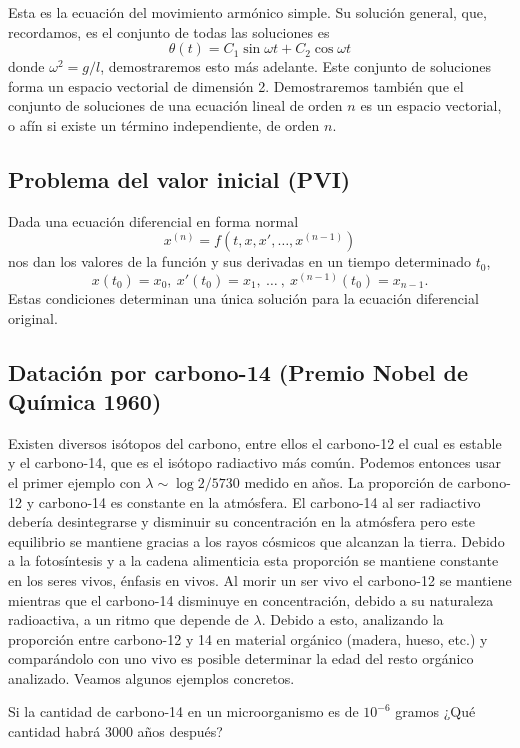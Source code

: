 \documentclass[../ecuaciones_diferenciales.tex]{subfiles}
\begin{document}
Esta es la ecuación del movimiento armónico simple. Su solución general, que,
recordamos, es el conjunto de todas las soluciones es
\[\theta(t) = C_1 \sin \omega t + C_2 \cos \omega t\]
donde \(\omega^2 = g/l\), demostraremos esto más adelante. Este conjunto de
soluciones forma un espacio vectorial de dimensión 2. Demostraremos también que
el conjunto de soluciones de una ecuación lineal de orden \(n\) es un espacio
vectorial, o afín si existe un término independiente, de orden \(n\).

\subsection{Problema del valor inicial (PVI)}

Dada una ecuación diferencial en forma normal
\[x^{(n)} = f(t, x, x', \dots, x^{(n - 1)})\]
nos dan los valores de la función y sus derivadas en un tiempo determinado
\(t_0\),
\[x(t_0) = x_0,\ x'(t_0) = x_1,\ \dots\ ,\ x^{(n - 1)}(t_0) = x_{n - 1}.\]
Estas condiciones determinan una única solución para la ecuación diferencial
original.

\subsection{Datación por carbono-14 (Premio Nobel de Química 1960)}

Existen diversos isótopos del carbono, entre ellos el carbono-12 el cual es
estable y el carbono-14, que es el isótopo radiactivo más común. Podemos
entonces usar el primer ejemplo con \(\lambda \sim \log 2 / 5730\) medido en
años. La proporción de carbono-12 y carbono-14 es constante en la atmósfera. El
carbono-14 al ser radiactivo debería desintegrarse y disminuir su concentración
en la atmósfera pero este equilibrio se mantiene gracias a los rayos cósmicos
que alcanzan la tierra. Debido a la fotosíntesis y a la cadena alimenticia esta
proporción se mantiene constante en los seres vivos, énfasis en vivos. Al morir
un ser vivo el carbono-12 se mantiene mientras que el carbono-14 disminuye en
concentración, debido a su naturaleza radioactiva, a un ritmo que depende de
\(\lambda\). Debido a esto, analizando la proporción entre carbono-12 y 14 en
material orgánico (madera, hueso, etc.) y comparándolo con uno vivo es posible
determinar la edad del resto orgánico analizado. Veamos algunos ejemplos
concretos.

\begin{example}
	Si la cantidad de carbono-14 en un microorganismo es de \(10^{-6}\) gramos
	¿Qué cantidad habrá 3000 años después?
\end{example}
\end{document}
